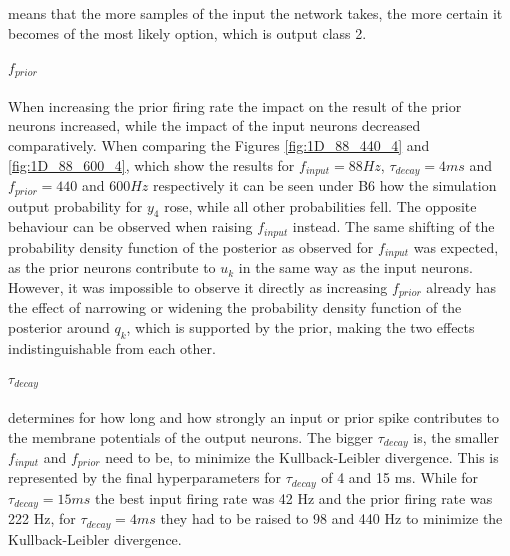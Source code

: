 means that the more samples of the input the network takes, the more certain it becomes of the most likely option, which is output class 2.

\paragraph{$f_{prior}$} When increasing the prior firing rate the impact on the result of the prior neurons increased, while the impact of the input neurons decreased comparatively. When comparing the Figures \ref{fig:1D_88_440_4} and \ref{fig:1D_88_600_4}, which show the results for $f_{input} = 88 Hz$, $\tau_{decay} = 4 ms$ and $f_{prior} = 440$ and $600 Hz$ respectively it can be seen under B6 how the simulation output probability for $y_4$ rose, while all other probabilities fell. The opposite behaviour can be observed when raising $f_{input}$ instead. The same shifting of the probability density function of the posterior as observed for $f_{input}$ was expected, as the prior neurons contribute to $u_k$ in the same way as the input neurons. However, it was impossible to observe it directly as increasing $f_{prior}$ already has the effect of narrowing or widening the probability density function of the posterior around $q_k$, which is supported by the prior, making the two effects indistinguishable from each other.

\paragraph{$\tau_{decay}$} determines for how long and how strongly an input or prior spike contributes to the membrane potentials of the output neurons. The bigger $\tau_{decay}$ is, the smaller $f_{input}$ and $f_{prior}$ need to be, to minimize the Kullback-Leibler divergence. This is represented by the final hyperparameters for $\tau_{decay}$ of 4 and 15 ms. While for $\tau_{decay} = 15 ms$ the best input firing rate was 42 Hz and the prior firing rate was 222 Hz, for $\tau_{decay} = 4 ms$ they had to be raised to 98 and 440 Hz to minimize the Kullback-Leibler divergence.

